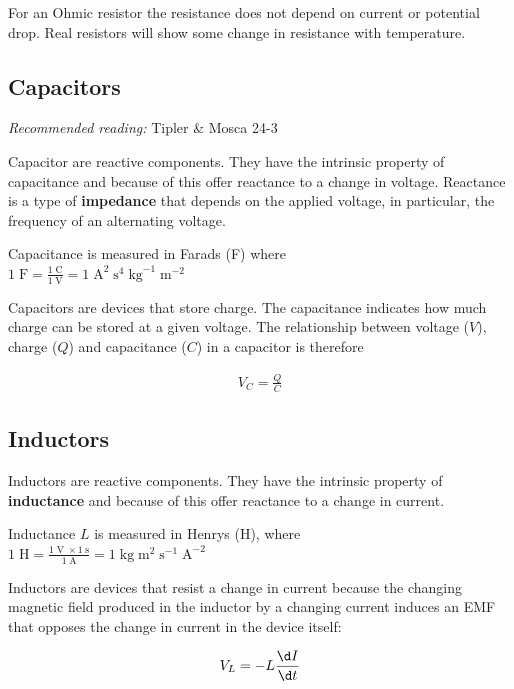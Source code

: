 \documentclass[
]{book}
\begin{document}
For an Ohmic resistor the resistance does not depend on current or
potential drop. Real resistors will show some change in resistance with
temperature.

\hypertarget{capacitors}{%
\subsection{Capacitors}\label{capacitors}}

\emph{Recommended reading:} Tipler \& Mosca 24-3

Capacitor are reactive components. They have the intrinsic property of
capacitance and because of this offer reactance to a change in voltage.
Reactance is a type of \textbf{impedance} that depends on the applied
voltage, in particular, the frequency of an alternating voltage.

Capacitance is measured in Farads (F) where\\
\(1 \; \text{F} = \frac{1 \; \text{C}}{1 \; \text{V}} = 1 \; \text{A}^2 \; \text{s}^4 \; \text{kg}^{-1} \; \text{m}^{-2}\)

Capacitors are devices that store charge. The capacitance indicates how
much charge can be stored at a given voltage. The relationship between
voltage (\(V\)), charge (\(Q\)) and capacitance (\(C\)) in a capacitor is
therefore

\[\begin{aligned}
V_C = \frac{Q}{C}
\end{aligned}\]

\hypertarget{inductors}{%
\subsection{Inductors}\label{inductors}}

Inductors are reactive components. They have the intrinsic property of
\textbf{inductance} and because of this offer reactance to a change in
current.

Inductance \(L\) is measured in Henrys (H), where\\
\(1 \; \text{H} = \frac{1 \; \text{V} \; \times 1 \; \text{s} } { 1 \; \text{A} } = 1 \; \text{kg} \; \text{m}^{2} \; \text{s}^{-1} \; \text{A}^{-2}\)

Inductors are devices that resist a change in current because the
changing magnetic field produced in the inductor by a changing current
induces an EMF that opposes the change in current in the device itself:

\[\begin{aligned}
V_L  = -L \frac{\d I}{\d t}
\end{aligned}\]
\end{document}

